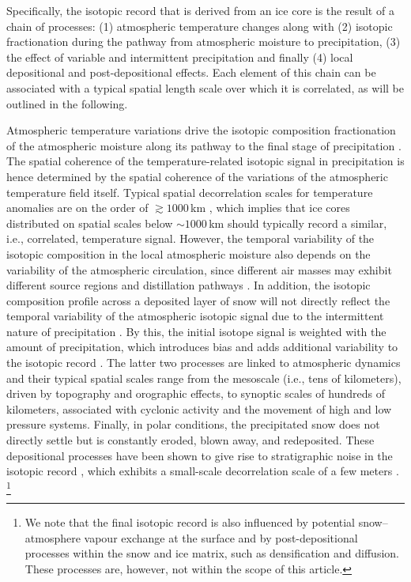 \documentclass[draft]{agujournal2019}
\begin{document}
Specifically, the isotopic record that is derived from an ice core is the result
of a chain of processes: (1) atmospheric temperature changes along with (2) isotopic
fractionation during the pathway from atmospheric moisture to precipitation, (3)
the effect of variable and intermittent precipitation and finally (4) local
depositional and post-depositional effects. Each element of this chain can be
associated with a typical spatial length scale over which it is correlated, as
will be outlined in the following.

Atmospheric temperature variations drive the isotopic composition fractionation
of the atmospheric moisture along its pathway to the final stage of
precipitation \cite{Dansgaard1964,Jouzel1984}. The spatial coherence of the
temperature-related isotopic signal in precipitation is hence determined by the
spatial coherence of the variations of the atmospheric temperature field
itself. Typical spatial decorrelation scales for temperature anomalies are on
the order of $\gtrsim1000$\,km \cite{Jones1997}, which implies that ice cores
distributed on spatial scales below $\sim 1000$\,km should typically record a
similar, i.e., correlated, temperature signal. However, the temporal variability
of the isotopic composition in the local atmospheric moisture also depends on
the variability of the atmospheric circulation, since different air masses may
exhibit different source regions and distillation pathways \cite{Schlosser2004,
Sodemann2008a,Birks2009,Kuttel2012}. In addition, the isotopic composition
profile across a deposited layer of snow will not directly reflect the temporal
variability of the atmospheric isotopic signal due to the intermittent nature of
precipitation \cite{Schleiss2015}. By this, the initial isotope signal is
weighted with the amount of precipitation, which introduces bias
\cite{Steig1994,Laepple2011a} and adds additional variability to the isotopic
record \cite{Persson2011,Casado2020}. The latter two processes are linked to
atmospheric dynamics and their typical spatial scales range from the mesoscale
(i.e., tens of kilometers), driven by topography and orographic effects, to
synoptic scales of hundreds of kilometers, associated with cyclonic activity and
the movement of high and low pressure systems. Finally, in polar conditions, the
precipitated snow does not directly settle but is constantly eroded, blown away,
and redeposited. These depositional processes have been shown to give rise to
stratigraphic noise in the isotopic record
\cite{Fisher1985,Munch2016,Laepple2016}, which exhibits a small-scale
decorrelation scale of a few meters \cite{Munch2016}.%
\footnote{We note that the final isotopic record is also influenced by
  potential snow--atmosphere vapour exchange at the surface and by
  post-depositional processes within the snow and ice matrix, such as
  densification and diffusion. These processes are, however, not within the
  scope of this article.}
\end{document}
